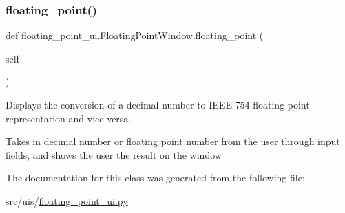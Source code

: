 \subsubsection{\texorpdfstring{floating\+\_\+point()}{floating\_point()}}
{\footnotesize\ttfamily def floating\+\_\+point\+\_\+ui.\+Floating\+Point\+Window.\+floating\+\_\+point (\begin{DoxyParamCaption}\item[{}]{self }\end{DoxyParamCaption})}



Displays the conversion of a decimal number to I\+E\+EE 754 floating point representation and vice versa. 

Takes in decimal number or floating point number from the user through input fields, and shows the user the result on the window 

The documentation for this class was generated from the following file\+:\begin{DoxyCompactItemize}
\item 
src/uis/\hyperlink{floating__point__ui_8py}{floating\+\_\+point\+\_\+ui.\+py}\end{DoxyCompactItemize}
